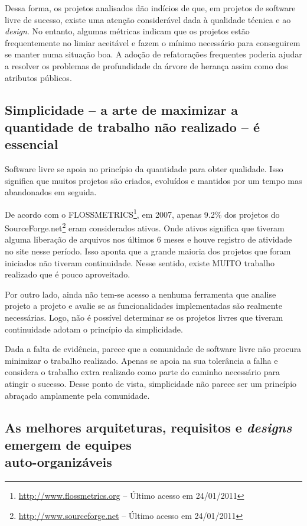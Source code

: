 Dessa forma, os projetos analisados dão indícios de que, em projetos
de software livre de sucesso, existe uma atenção considerável dada à
qualidade técnica e ao \textit{design}. No entanto, algumas métricas
indicam que os projetos estão frequentemente no limiar aceitável e
fazem o mínimo necessário para conseguirem se manter numa situação
boa. A adoção de refatorações frequentes poderia ajudar a resolver os
problemas de profundidade da árvore de herança assim como dos
atributos públicos.

\subsection[Simplicidade é essencial]{Simplicidade -- a arte de
  maximizar a quantidade de trabalho não realizado -- é essencial}

Software livre se apoia no princípio da quantidade para obter
qualidade. Isso significa que muitos projetos são criados, evoluídos e
mantidos por um tempo mas abandonados em seguida.

De acordo com o
FLOSSMETRICS\footnote{\url{http://www.flossmetrics.org} -- Último
  acesso em 24/01/2011}, em 2007, apenas 9.2\% dos projetos do
SourceForge.net\footnote{\url{http://www.sourceforge.net} -- Último
  acesso em 24/01/2011} eram considerados ativos. Onde ativos
significa que tiveram alguma liberação de arquivos nos últimos 6 meses
e houve registro de atividade no site nesse período. Isso aponta que a
grande maioria dos projetos que foram iniciados não tiveram
continuidade. Nesse sentido, existe MUITO trabalho realizado que é
pouco aproveitado.

Por outro lado, ainda não tem-se acesso a nenhuma ferramenta que
analise projeto a projeto e avalie se as funcionalidades implementadas
são realmente necessárias. Logo, não é possível determinar se os
projetos livres que tiveram continuidade adotam o princípio da
simplicidade.

Dada a falta de evidência, parece que a comunidade de software livre
não procura minimizar o trabalho realizado. Apenas se apoia na sua
tolerância a falha e considera o trabalho extra realizado como parte
do caminho necessário para atingir o sucesso. Desse ponto de vista,
simplicidade não parece ser um princípio abraçado amplamente pela
comunidade.

\subsection[Equipes auto-organizáveis]{As melhores arquiteturas,
  requisitos e \textit{designs} emergem de equipes\\auto-organizáveis}

